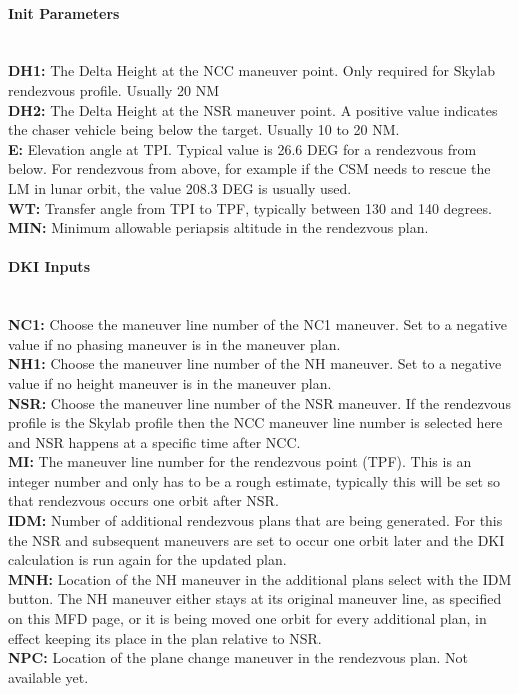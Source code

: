 \documentclass[11pt]{article} %
\begin{document}
\paragraph{Init Parameters}\mbox{} \\

\textbf{DH1:} The Delta Height at the NCC maneuver point. Only required for Skylab rendezvous profile. Usually 20 NM\\
\textbf{DH2:} The Delta Height at the NSR maneuver point. A positive value indicates the chaser vehicle being below the target. Usually 10 to 20 NM.\\
\textbf{E:} Elevation angle at TPI. Typical value is 26.6 DEG for a rendezvous from below. For rendezvous from above, for example if the CSM needs to rescue the LM in lunar orbit, the value 208.3 DEG is usually used.\\
\textbf{WT:} Transfer angle from TPI to TPF, typically between 130 and 140 degrees.\\
\textbf{MIN:} Minimum allowable periapsis altitude in the rendezvous plan.\\

\paragraph{DKI Inputs}\mbox{} \\

\textbf{NC1:} Choose the maneuver line number of the NC1 maneuver. Set to a negative value if no phasing maneuver is in the maneuver plan.\\
\textbf{NH1:} Choose the maneuver line number of the NH maneuver. Set to a negative value if no height maneuver is in the maneuver plan.\\
\textbf{NSR:} Choose the maneuver line number of the NSR maneuver. If the rendezvous profile is the Skylab profile then the NCC maneuver line number is selected here and NSR happens at a specific time after NCC.\\
\textbf{MI:} The maneuver line number for the rendezvous point (TPF). This is an integer number and only has to be a rough estimate, typically this will be set so that rendezvous occurs one orbit after NSR.\\
\textbf{IDM:} Number of additional rendezvous plans that are being generated. For this the NSR and subsequent maneuvers are set to occur one orbit later and the DKI calculation is run again for the updated plan.\\
\textbf{MNH:} Location of the NH maneuver in the additional plans select with the IDM button. The NH maneuver either stays at its original maneuver line, as specified on this MFD page, or it is being moved one orbit for every additional plan, in effect keeping its place in the plan relative to NSR.\\
\textbf{NPC:} Location of the plane change maneuver in the rendezvous plan. Not available yet.\\
 
\end{document}
